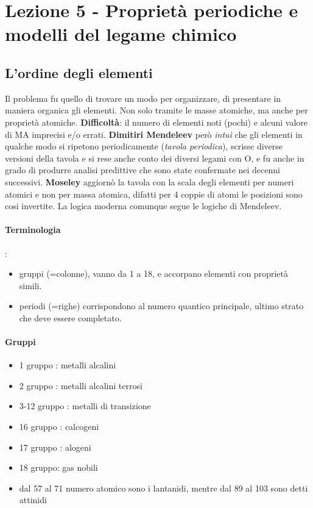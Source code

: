 \chapter{Lezione 5 - Proprietà periodiche e modelli del legame chimico}


\section{L'ordine degli elementi}
Il problema fu quello di trovare un modo per organizzare, di presentare in maniera organica gli elementi. Non solo tramite le masse atomiche, ma anche per proprietà atomiche. \textbf{Difficoltà}: il numero di elementi noti (pochi) e alcuni valore di MA imprecisi e/o errati. 
\textbf{Dimitiri Mendeleev} però \emph{intuì} che gli elementi in qualche modo si ripetono periodicamente (\emph{tavola periodica}), scrisse diverse versioni della tavola e si rese anche conto dei diversi legami con O, e fu anche in grado di produrre analisi predittive che sono state confermate nei decenni successivi. 
\textbf{Moseley} aggiornò la tavola con la scala degli elementi per numeri atomici e non per massa atomica, difatti per 4 coppie di atomi le posizioni sono cosi invertite. La logica moderna comunque segue le logiche di Mendeleev. 

\subsubsection{Terminologia}: 
\begin{itemize}
    \item gruppi (=colonne), vanno da 1 a 18, e accorpano elementi con proprietà simili.
    \item periodi (=righe) corrispondono al numero quantico principale, ultimo strato che deve essere completato. 
\end{itemize}

\subsubsection{Gruppi}
\begin{itemize}
    \item 1 gruppo : metalli alcalini
    \item 2 gruppo : metalli alcalini terrosi
    \item 3-12 gruppo : metalli di transizione
    \item 16 gruppo : calcogeni
    \item 17 gruppo : alogeni
    \item 18 gruppo: gas nobili
    \item dal 57 al 71 numero atomico sono i lantanidi, mentre dal 89 al 103 sono detti attinidi
\end{itemize}

